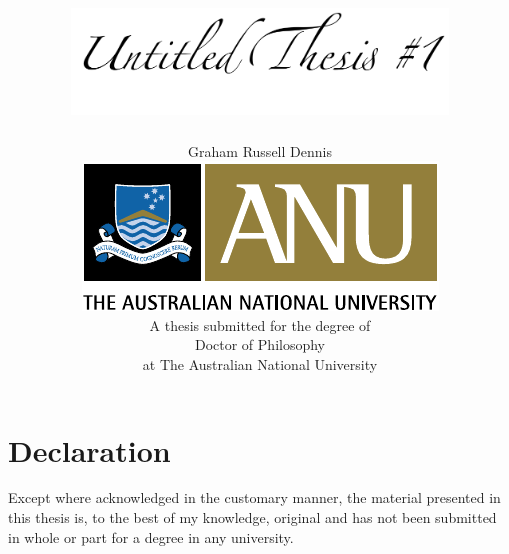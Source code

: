 \documentclass[twoside,onecolumn,11pt,a4paper,draft]{book}
\begin{document}

\begin{titlepage}
\graphicspath{{Figures/TitlePage/}}
\title{\includegraphics[width=10cm]{UntitledTitle}}
 \author{Graham Russell Dennis\\[6cm]
 \includegraphics{ANU_PMS}\\[2cm]
  A thesis submitted for the degree of\\
  Doctor of Philosophy \\
  at The Australian National University\\[1cm]}
\maketitle
 \end{titlepage}
 
 \sloppy
 
\chapter*{Declaration}


Except where acknowledged in the customary manner, the material 
presented in this thesis is, to the best of my knowledge, original and 
has not been submitted in whole or part for a degree in any 
university.

\vspace{20mm}  %
\end{document}
